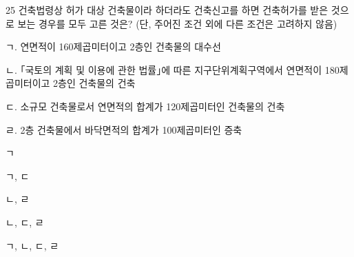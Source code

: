 \begin{question}{25}
건축법령상 허가 대상 건축물이라 하더라도 건축신고를 하면 건축허가를 받은 것으로 보는 경우를 모두 고른 것은? (단, 주어진 조건 외에 다른 조건은 고려하지 않음)
\begin{framedtext}
ㄱ. 연면적이 160제곱미터이고 2층인 건축물의 대수선 \par
ㄴ. ｢국토의 계획 및 이용에 관한 법률｣에 따른 지구단위계획구역에서 연면적이 180제곱미터이고 2층인 건축물의 건축 \par
ㄷ. 소규모 건축물로서 연면적의 합계가 120제곱미터인 건축물의 건축 \par
ㄹ. 2층 건축물에서 바닥면적의 합계가 100제곱미터인 증축 \par
\end{framedtext}
\begin{choices}
  \item ㄱ
  \item ㄱ, ㄷ
  \item ㄴ, ㄹ
  \item ㄴ, ㄷ, ㄹ
  \item ㄱ, ㄴ, ㄷ, ㄹ
\end{choices}
\end{question}
